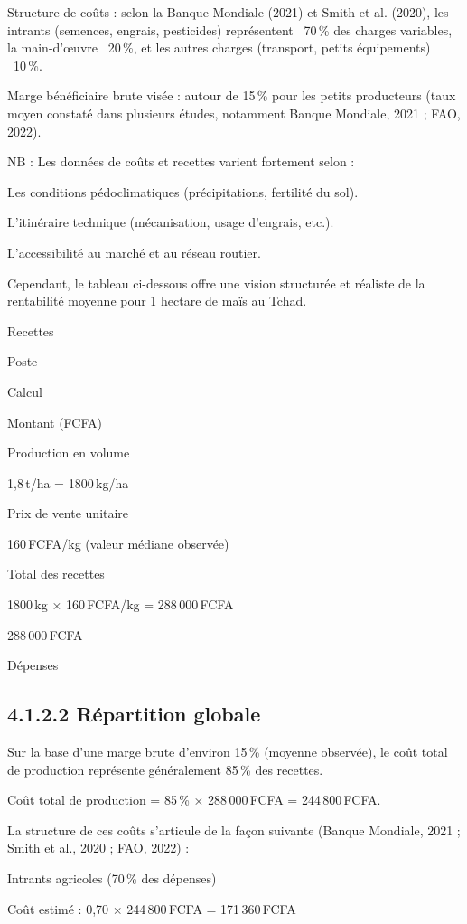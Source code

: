 \documentclass[12pt,oneside]{report}
\begin{document}
Structure de coûts : selon la Banque Mondiale (2021) et Smith et al. (2020), les intrants (semences, engrais, pesticides) représentent ~70 \% des charges variables, la main-d’œuvre ~20 \%, et les autres charges (transport, petits équipements) ~10 \%.

Marge bénéficiaire brute visée : autour de 15 \% pour les petits producteurs (taux moyen constaté dans plusieurs études, notamment Banque Mondiale, 2021 ; FAO, 2022).

NB : Les données de coûts et recettes varient fortement selon :

Les conditions pédoclimatiques (précipitations, fertilité du sol).

L’itinéraire technique (mécanisation, usage d’engrais, etc.).

L’accessibilité au marché et au réseau routier.

Cependant, le tableau ci-dessous offre une vision structurée et réaliste de la rentabilité moyenne pour 1 hectare de maïs au Tchad.

Recettes

Poste

Calcul

Montant (FCFA)

Production en volume

1,8 t/ha = 1800 kg/ha

Prix de vente unitaire

160 FCFA/kg (valeur médiane observée)

Total des recettes

1800 kg × 160 FCFA/kg = 288 000 FCFA

288 000 FCFA

Dépenses

\subsection{4.1.2.2 Répartition globale}
Sur la base d’une marge brute d’environ 15 \% (moyenne observée), le coût total de production représente généralement 85 \% des recettes.

Coût total de production = 85 \% × 288 000 FCFA = 244 800 FCFA.

La structure de ces coûts s’articule de la façon suivante (Banque Mondiale, 2021 ; Smith et al., 2020 ; FAO, 2022) :

Intrants agricoles (70 \% des dépenses)

Coût estimé : 0,70 × 244 800 FCFA = 171 360 FCFA
\end{document}
